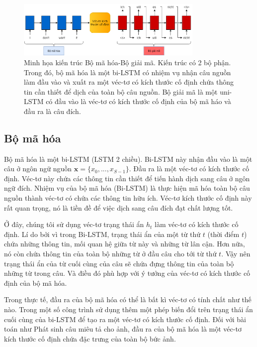 \begin{figure}
	\centering
	\includegraphics[width=0.8\textwidth]{Encoder-Decoder_2}
	\caption[Minh họa kiến trúc Bộ mã hóa-Bộ giải mã.]{Minh họa kiến trúc Bộ mã hóa-Bộ giải mã. Kiến trúc có 2 bộ phận. Trong đó, bộ mã hóa là một bi-LSTM có nhiệm vụ nhận câu nguồn làm đầu vào và xuất ra một véc-tơ có kích thước cố định chứa thông tin cần thiết để dịch của toàn bộ câu nguồn. Bộ giải mã là một uni-LSTM có đầu vào là véc-tơ có kích thước cố định của bộ mã háo và đầu ra là câu đích.}
	\label{fig_Encoder-Decoder}
\end{figure}

\subsection{Bộ mã hóa}
Bộ mã hóa là một bi-LSTM (LSTM 2 chiều). Bi-LSTM này nhận đầu vào là một câu ở ngôn ngữ nguồn $\bm{x} = \{x_0, ..., x_{S-1}\}$. Đầu ra là một véc-tơ có kích thước cố định. Véc-tơ này chứa các thông tin cần thiết để tiến hành dịch sang câu ở ngôn ngữ đích. Nhiệm vụ của bộ mã hóa (Bi-LSTM) là thực hiện mã hóa toàn bộ câu nguồn thành véc-tơ có chứa các thông tin hữu ích. Véc-tơ kích thước cố định này rất quan trọng, nó là tiền đề để việc dịch sang câu đích đạt chất lượng tốt.

Ở đây, chúng tôi sử dụng véc-tơ trạng thái ẩn $h_t$ làm véc-tơ có kích thước cố định. Lí do bởi vì trong Bi-LSTM, trạng thái ẩn của một từ thứ $t$ (thời điểm $t$) chứa những thông tin, mối quan hệ giữa từ này và những từ lân cận. Hơn nữa, nó còn chứa thông tin của toàn bộ những từ ở đầu câu cho tới từ thứ $t$. Vậy nên trạng thái ẩn của từ cuối cùng của câu sẽ chứa đựng thông tin của toàn bộ những từ trong câu. Và điều đó phù hợp với ý tưởng của véc-tơ có kích thước cố định của bộ mã hóa. 

Trong thực tế, đầu ra của bộ mã hóa có thể là bất kì véc-tơ có tính chất như thế nào. Trong một số công trình sử dụng thêm một phép biến đổi trên trạng thái ẩn cuối cùng của bi-LSTM để tạo ra một véc-tơ có kích thước cố định. Đối với bài toán như Phát sinh câu miêu tả cho ảnh, đầu ra của bộ mã hóa là một véc-tơ kích thước cố định chứa đặc trưng của toàn bộ bức ảnh.


